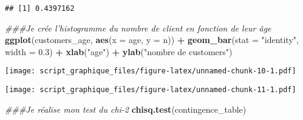 \documentclass[
]{article}
\newenvironment{Shaded}{\begin{snugshade}}{\end{snugshade}}
\newcommand{\CommentTok}[1]{\textcolor[rgb]{0.56,0.35,0.01}{\textit{#1}}}
\newcommand{\DataTypeTok}[1]{\textcolor[rgb]{0.13,0.29,0.53}{#1}}
\newcommand{\FloatTok}[1]{\textcolor[rgb]{0.00,0.00,0.81}{#1}}
\newcommand{\KeywordTok}[1]{\textcolor[rgb]{0.13,0.29,0.53}{\textbf{#1}}}
\newcommand{\NormalTok}[1]{#1}
\newcommand{\OperatorTok}[1]{\textcolor[rgb]{0.81,0.36,0.00}{\textbf{#1}}}
\newcommand{\OtherTok}[1]{\textcolor[rgb]{0.56,0.35,0.01}{#1}}
\newcommand{\StringTok}[1]{\textcolor[rgb]{0.31,0.60,0.02}{#1}}
\begin{document}
\begin{verbatim}
## [1] 0.4397162
\end{verbatim}

\begin{Shaded}
\begin{Highlighting}[]
\CommentTok{###Je crée l'histogramme du nombre de client en fonction de leur âge }
\KeywordTok{ggplot}\NormalTok{(customers_age, }\KeywordTok{aes}\NormalTok{(}\DataTypeTok{x =}\NormalTok{ age, }\DataTypeTok{y =}\NormalTok{ n)) }\OperatorTok{+}\StringTok{ }
\StringTok{  }\KeywordTok{geom_bar}\NormalTok{(}\DataTypeTok{stat =} \StringTok{"identity"}\NormalTok{, }\DataTypeTok{width =} \FloatTok{0.3}\NormalTok{) }\OperatorTok{+}
\StringTok{  }\KeywordTok{xlab}\NormalTok{(}\StringTok{"age"}\NormalTok{) }\OperatorTok{+}\StringTok{ }\KeywordTok{ylab}\NormalTok{(}\StringTok{"nombre de customers"}\NormalTok{)}
\end{Highlighting}
\end{Shaded}

\texttt{[image: script\_graphique\_files/figure-latex/unnamed-chunk-10-1.pdf]}

\begin{Shaded}
\end{Shaded}

\texttt{[image: script\_graphique\_files/figure-latex/unnamed-chunk-11-1.pdf]}

\begin{Shaded}
\begin{Highlighting}[]
\CommentTok{###Je réalise mon test du chi-2}
\KeywordTok{chisq.test}\NormalTok{(contingence_table)}
\end{Highlighting}
\end{Shaded}
\end{document}
